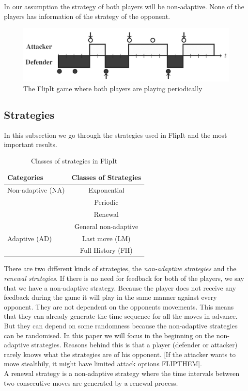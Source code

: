 In our assumption the strategy of both players will be non-adaptive. None of the players has information of the strategy of the opponent. 


\begin{figure}[hbtp]
\centering
\includegraphics[scale=0.25]{Images/FlipItDefault.jpg}
\caption{The FlipIt game where both players are playing periodically}
\label{fig:FLipItDefault}
\end{figure}

\subsection{Strategies}
 
 In this subsection we go through the strategies used in FlipIt and the most important results. 
 \begin{table}
 \centering
 \begin{tabular}{ l | c  }
  \textbf{Categories} & \textbf{Classes of Strategies} \\
  \hline Non-adaptive (NA) & Exponential \\
  & Periodic \\
  & Renewal \\
  & General non-adaptive \\
  \hline Adaptive (AD) & Last move (LM) \\
  & Full History (FH) \\  
\end{tabular}
 \caption{Classes of strategies in FlipIt}
 \label{table:Strategies}
 \end{table}

There are two different kinds of strategies, the \textit{non-adaptive strategies} and the \textit{renewal strategies}. If there is no need for feedback for both of the players, we say that we have a non-adaptive strategy. Because the player does not receive any feedback during the game it will play in the same manner against every opponent. They are not dependent on the opponents movements. This means that they can already generate the time sequence for all the moves in advance.  But they can depend on some randomness because the non-adaptive strategies can be randomised. 
In this paper we will focus in the beginning on the non-adaptive strategies. Reasons behind this is that a player (defender or attacker) rarely knows what the strategies are of his opponent. [If the attacker wants to move stealthily, it might have limited attack options FLIPTHEM]. \\
A renewal strategy is a non-adaptive strategy where the time intervals between two consecutive moves are generated by a renewal process. \\

